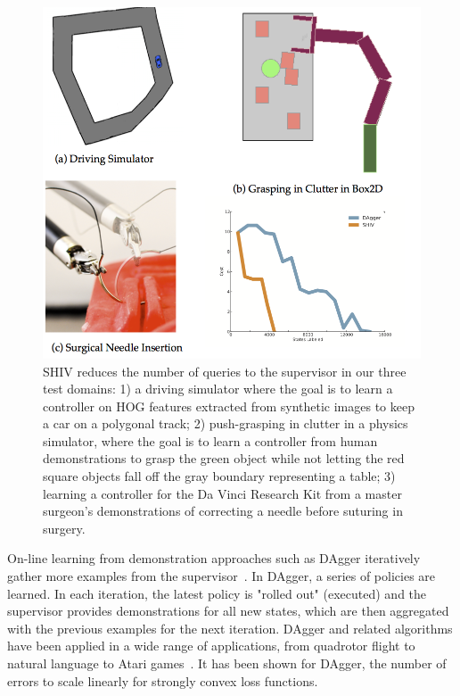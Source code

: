 \documentclass[10pt, conference]{ieeeconf}      %
\begin{document}
\begin{figure}[t!]
\centering
\includegraphics[width=\columnwidth]{figures/teaser.pdf}
\caption{ 
SHIV reduces the number of queries to the supervisor in our three test domains: 1) a driving simulator where the goal is to learn a controller on HOG features extracted from synthetic images to keep a car on a polygonal track; 2) push-grasping in clutter in a physics simulator, where the goal is to learn a controller from human demonstrations to grasp the green object while not letting the red square objects fall off the gray boundary representing a table; 3) learning a controller for the Da Vinci Research Kit from a master surgeon's demonstrations of correcting a needle before suturing in surgery. 
}
\vspace*{-10pt}
\label{fig:teaser}
\end{figure}


On-line learning from demonstration approaches such as DAgger iteratively gather more examples from the supervisor~\cite{grollman2007dogged,ross2010efficient,ross2010reduction}. In DAgger, a series of policies are learned.  In each iteration, the latest policy is "rolled out" (executed) and the supervisor provides demonstrations for all  new states, which are then aggregated with the previous examples for the next iteration. DAgger and related algorithms have been applied in a wide range of applications, from quadrotor flight to natural language to Atari games~\cite{NIPS2014_5421,duvallet2013imitation,ross2013learning}. It has been shown for DAgger, the number of errors to scale linearly for strongly convex loss functions. 
\end{document}
